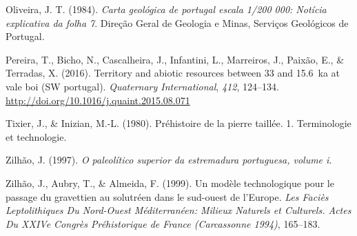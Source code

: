 \documentclass[12pt,twoside]{reedthesis}
\begin{document}
\leavevmode\hypertarget{ref-oliveira1984}{}%
Oliveira, J. T. (1984). \emph{Carta geológica de portugal escala 1/200 000: Notícia explicativa da folha 7}. Direção Geral de Geologia e Minas, Serviços Geológicos de Portugal.

\leavevmode\hypertarget{ref-pereira2016}{}%
Pereira, T., Bicho, N., Cascalheira, J., Infantini, L., Marreiros, J., Paixão, E., \& Terradas, X. (2016). Territory and abiotic resources between 33 and 15.6~ka at vale boi (SW portugal). \emph{Quaternary International}, \emph{412}, 124--134. \url{http://doi.org/10.1016/j.quaint.2015.08.071}

\leavevmode\hypertarget{ref-tixier1980}{}%
Tixier, J., \& Inizian, M.-L. (1980). Préhistoire de la pierre taillée. 1. Terminologie et technologie.

\leavevmode\hypertarget{ref-zilhao1997}{}%
Zilhão, J. (1997). \emph{O paleolítico superior da estremadura portuguesa, volume i}.

\leavevmode\hypertarget{ref-zilhaoetal1999}{}%
Zilhão, J., Aubry, T., \& Almeida, F. (1999). Un modèle technologique pour le passage du gravettien au solutréen dans le sud-ouest de l'Europe. \emph{Les Faciès Leptolithiques Du Nord-Ouest Méditerranéen: Milieux Naturels et Culturels. Actes Du XXIVe Congrès Préhistorique de France (Carcassonne 1994)}, 165--183.


\end{document}
